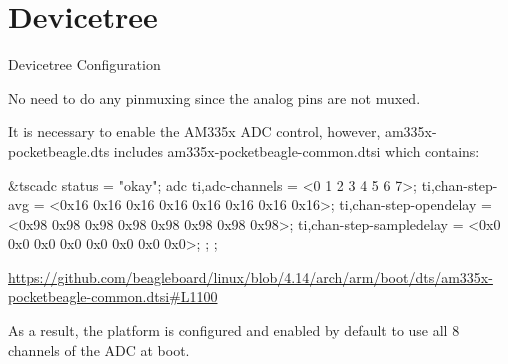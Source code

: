 \section{Devicetree}

\begin{frame}
	{Devicetree Configuration}

	No need to do any pinmuxing since the analog pins are not muxed.

	It is necessary to enable the AM335x ADC control, however, am335x-pocketbeagle.dts includes am335x-pocketbeagle-common.dtsi which contains:
	\begin{rawscriptsize}
		&tscadc {
			status = "okay";
			adc {
				ti,adc-channels = <0 1 2 3 4 5 6 7>;
				ti,chan-step-avg = <0x16 0x16 0x16 0x16 0x16 0x16 0x16 0x16>;
				ti,chan-step-opendelay = <0x98 0x98 0x98 0x98 0x98 0x98 0x98 0x98>;
				ti,chan-step-sampledelay = <0x0 0x0 0x0 0x0 0x0 0x0 0x0 0x0>;
			};
		};
	\end{rawscriptsize}
	\url{https://github.com/beagleboard/linux/blob/4.14/arch/arm/boot/dts/am335x-pocketbeagle-common.dtsi#L1100}

	As a result, the platform is configured and enabled by default to use all 8 channels of the ADC at boot.
\end{frame}
